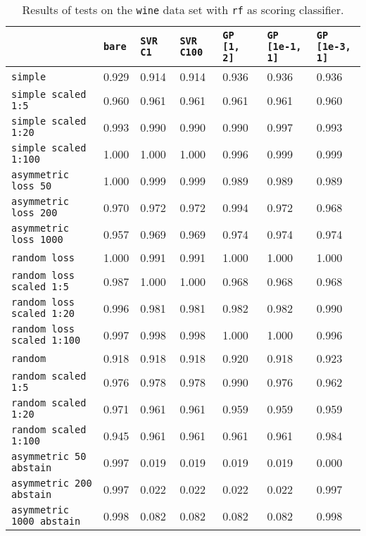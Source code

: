 \begin{table}[H]
{\scriptsize
\begin{tabu}{l|l|l|l|l|l|l}
&\texttt{bare} &\texttt{SVR C1} &\texttt{SVR C100} &\texttt{GP [1, 2]} &\texttt{GP [1e-1, 1]} &\texttt{GP [1e-3, 1]}  \\
\hline
\texttt{simple} &0.929 &0.914 &0.914 &0.936 &0.936 &0.936 \\
\texttt{simple scaled 1:5} &0.960 &0.961 &0.961 &0.961 &0.961 &0.960 \\
\texttt{simple scaled 1:20} &0.993 &0.990 &0.990 &0.990 &0.997 &0.993 \\
\texttt{simple scaled 1:100} &1.000 &1.000 &1.000 &0.996 &0.999 &0.999 \\
\texttt{asymmetric loss 50} &1.000 &0.999 &0.999 &0.989 &0.989 &0.989 \\
\texttt{asymmetric loss 200} &0.970 &0.972 &0.972 &0.994 &0.972 &0.968 \\
\texttt{asymmetric loss 1000} &0.957 &0.969 &0.969 &0.974 &0.974 &0.974 \\
\texttt{random loss} &1.000 &0.991 &0.991 &1.000 &1.000 &1.000 \\
\texttt{random loss scaled 1:5} &0.987 &1.000 &1.000 &0.968 &0.968 &0.968 \\
\texttt{random loss scaled 1:20} &0.996 &0.981 &0.981 &0.982 &0.982 &0.990 \\
\texttt{random loss scaled 1:100} &0.997 &0.998 &0.998 &1.000 &1.000 &0.996 \\
\texttt{random} &0.918 &0.918 &0.918 &0.920 &0.918 &0.923 \\
\texttt{random scaled 1:5} &0.976 &0.978 &0.978 &0.990 &0.976 &0.962 \\
\texttt{random scaled 1:20} &0.971 &0.961 &0.961 &0.959 &0.959 &0.959 \\
\texttt{random scaled 1:100} &0.945 &0.961 &0.961 &0.961 &0.961 &0.984 \\
\texttt{asymmetric 50 abstain} &0.997 &0.019 &0.019 &0.019 &0.019 &0.000 \\
\texttt{asymmetric 200 abstain} &0.997 &0.022 &0.022 &0.022 &0.022 &0.997 \\
\texttt{asymmetric 1000 abstain} &0.998 &0.082 &0.082 &0.082 &0.082 &0.998 \\
\end{tabu} }
\caption{Results of tests on the \texttt{wine} data set
         with \texttt{rf} as scoring classifier.}
\end{table}
